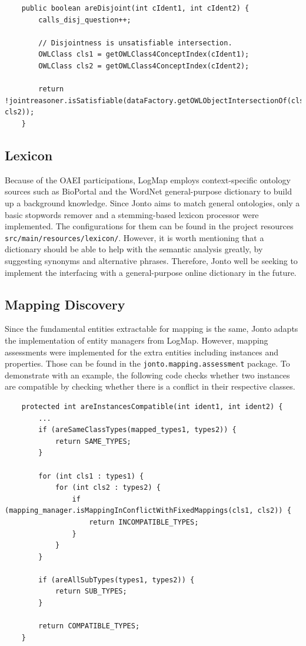 \lstset{language=Java}
\begin{lstlisting}
    public boolean areDisjoint(int cIdent1, int cIdent2) {
        calls_disj_question++;

        // Disjointness is unsatisfiable intersection.
        OWLClass cls1 = getOWLClass4ConceptIndex(cIdent1);
        OWLClass cls2 = getOWLClass4ConceptIndex(cIdent2);

        return !jointreasoner.isSatisfiable(dataFactory.getOWLObjectIntersectionOf(cls1, cls2));
    }
\end{lstlisting}

\subsection{Lexicon}

Because of the OAEI participations, LogMap employs context-specific ontology sources such as BioPortal and the WordNet general-purpose dictionary to build up a background knowledge. Since Jonto aims to match general ontologies, only a basic stopwords remover and a stemming-based lexicon processor were implemented. The configurations for them can be found in the project resources \texttt{src/main/resources/lexicon/}. However, it is worth mentioning that a dictionary should be able to help with the semantic analysis greatly, by suggesting synonyms and alternative phrases. Therefore, Jonto well be seeking to implement the interfacing with a general-purpose online dictionary in the future.

\subsection{Mapping Discovery}

Since the fundamental entities extractable for mapping is the same, Jonto adapts the implementation of entity managers from LogMap. However, mapping assessments were implemented for the extra entities including instances and properties. Those can be found in the \texttt{jonto.mapping.assessment} package. To demonstrate with an example, the following code checks whether two instances are compatible by checking whether there is a conflict in their respective classes.

\lstset{language=Java}
\begin{lstlisting}
	protected int areInstancesCompatible(int ident1, int ident2) {
		...
	    if (areSameClassTypes(mapped_types1, types2)) {
	        return SAME_TYPES;
	    }

	    for (int cls1 : types1) {
	        for (int cls2 : types2) {
	            if (mapping_manager.isMappingInConflictWithFixedMappings(cls1, cls2)) {
	                return INCOMPATIBLE_TYPES;
	            }
	        }
	    }
	    
	    if (areAllSubTypes(types1, types2)) {
	        return SUB_TYPES;
	    }

	    return COMPATIBLE_TYPES;
	}
\end{lstlisting}

